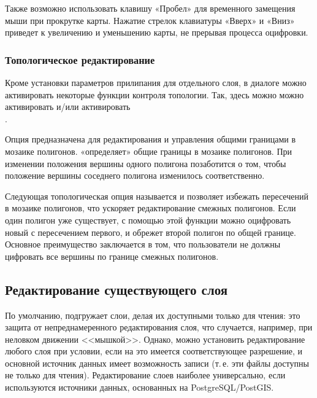 Также возможно использовать клавишу «Пробел» для временного замещения мыши при
прокрутке карты. Нажатие стрелок клавиатуры «Вверх» и «Вниз» приведет к
увеличению и уменьшению карты, не прерывая процесса оцифровки.

\subsubsection{Топологическое редактирование}

Кроме установки параметров прилипания для отдельного слоя, в диалоге
 можно активировать некоторые функции контроля
топологии. Так, здесь можно можно активировать  и/или активировать \\
.


Опция  предназначена для
редактирования и управления общими границами в мозаике полигонов. \qg
«определяет» общие границы в мозаике полигонов. При изменении положения
вершины одного полигона \qg позаботится о том, чтобы положение вершины
соседнего полигона изменилось соответственно.


Следующая топологическая опция называется  и позволяет избежать пересечений в мозаике полигонов, что
ускоряет редактирование смежных полигонов. Если один полигон уже существует,
с помощью этой функции можно оцифровать новый с пересечением первого, и
\qg обрежет второй полигон по общей границе. Основное преимущество заключается
в том, что пользователи не должны цифровать все вершины по границе смежных
полигонов.

\subsection{Редактирование существующего слоя}
\label{sec:edit_existing_layer}

По умолчанию, \qg подгружает слои, делая их доступными только для чтения:
это защита от непреднамеренного редактирования слоя, что случается, например,
при неловком движении <<мышкой>>. Однако, можно установить редактирование любого слоя
при условии, если на это имеется соответствующее разрешение, и основной
источник данных имеет возможность записи (т.\,е. эти файлы доступны не только
для чтения). Редактирование слоев наиболее универсально, если используются
источники данных, основанных на PostgreSQL/PostGIS.


